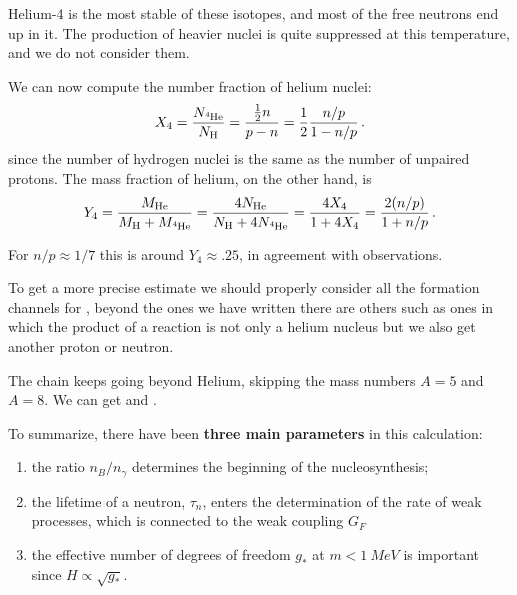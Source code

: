 \documentclass[main.tex]{subfiles}
\begin{document}
Helium-4 is the most stable of these isotopes, and most of the free neutrons end up in it. 
The production of heavier nuclei is quite suppressed at this temperature, and we do not consider them.


We can now compute the number fraction of helium nuclei: 
%
\begin{align}
X_4 = \frac{N_{\ce{^{4}He}}}{N_{\ce{H}}} 
= \frac{ \frac{1}{2} n }{p - n}
= \frac{1}{2} \frac{n/p}{1 - n/p}
\,.
\end{align}
%
since the number of hydrogen nuclei is the same as the number of unpaired protons. 
The mass fraction of helium, on the other hand, is
%
\begin{align}
Y_{4} 
= \frac{M_{\ce{He}}}{M_{\ce{H}} + M_{\ce{^{4}He}}} 
= \frac{4 N_{\ce{He}}}{N_{\ce{H}} + 4 N_{\ce{^{4}He}}} 
= \frac{4 X_4}{1 + 4 X_4} = \frac{2 (n/p)}{1 + n/p}
\,.
\end{align}

For \(n / p \approx 1/7\) this is around \(Y_4 \approx \num{.25}\), in agreement with observations.

To get a more precise estimate we should properly consider all the formation channels for , beyond the ones we have written there are others such as ones in which the product of a reaction is not only a helium nucleus but we also get another proton or neutron. 

The chain keeps going beyond Helium, skipping the mass numbers \(A = 5\) and \(A= 8 \). We can get  and . 

To summarize, there have been \textbf{three main parameters} in this calculation: 
\begin{enumerate}
    \item the ratio \(n_B / n_\gamma \) determines the beginning of the nucleosynthesis;
    \item the lifetime of a neutron, \(\tau_{n}\), enters the determination of the rate of weak processes, which is connected to the weak coupling \(G_F\) 
    \item the effective number of degrees of freedom \(g_*\) at \(m < \SI{1}{MeV}\) is important since \(H \propto \sqrt{g_*}\).
\end{enumerate}
\end{document}
